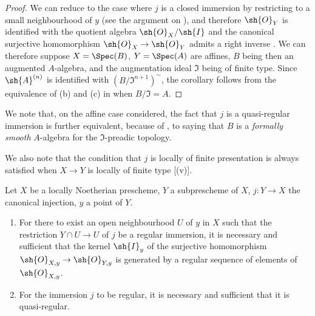 \begin{proof}
We can reduce to the case where $j$ is a closed immersion by restricting to a small neighbourhood of $y$ (see the argument on ), and therefore $\sh{O}_Y$ is identified with the quotient algebra $\sh{O}_X/\sh{I}$ and the canonical surjective homomorphism $\sh{O}_X \to \sh{O}_Y$ admits a
right inverse .
We can therefore suppose $X = \Spec(B)$, $Y = \Spec(A)$ are affines, $B$ being then an augmented $A$-algebra, and the augmentation ideal $\mathfrak{I}$ being of finite type.
Since $\sh{A}^{(n)}$ is identified with $(B/\mathfrak{I}^{n+1})^{\sim}$, the  corollary follows from the equivalence of (b) and (c) in  when $B/\mathfrak{I} = A$.
\end{proof}

We note that, on the affine case considered, the fact that $j$ is a quasi-regular immersion is further equivalent, because of , to saying that $B$ is a \emph{formally smooth} $A$-algebra for the $\mathfrak{I}$-preadic topology.

We also note that the condition that $j$ is locally of finite presentation is always satisfied when $X \to Y$ is locally of finite type [(v)].

\begin{proposition}[16.9.10]
\label{IV.16.9.10}
Let $X$ be a locally Noetherian prescheme, $Y$ a subprescheme of $X$, $j:Y \to X$ the canonical injection, $y$ a point of $Y$.
\begin{enumerate}
  \item[\rm{(i)}] For there to exist an open neighbourhood $U$ of $y$ in $X$ such that the restriction $Y \cap U \to U$ of $j$ be a regular immersion, it is necessary and sufficient that the kernel $\sh{I}_y$ of the surjective homomorphism $\sh{O}_{X,y} \to \sh{O}_{Y,y}$ is generated by a regular sequence of elements of $\sh{O}_{X,y}$.

  \item[\rm{(ii)}] For the immersion $j$ to be regular, it is necessary and sufficient that it is quasi-regular.
\end{enumerate}
\end{proposition}


